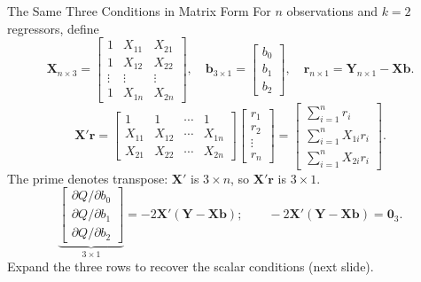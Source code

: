 \documentclass[notes,10pt, aspectratio=169]{beamer}
\begin{document}
\begin{frame}{The Same Three Conditions in Matrix Form}
\footnotesize
\setlength{\abovedisplayskip}{4pt}
\setlength{\belowdisplayskip}{4pt}
For $n$ observations and $k=2$ regressors, define
\[
\bm{X}_{n\times3}=\begin{bmatrix}1&X_{11}&X_{21}\\1&X_{12}&X_{22}\\\vdots&\vdots&\vdots\\1&X_{1n}&X_{2n}\end{bmatrix},
\quad \bm{b}_{3\times1}=\begin{bmatrix}b_0\\b_1\\b_2\end{bmatrix},
\quad \bm{r}_{n\times1}=\bm{Y}_{n\times1}-\bm{Xb}.
\]
\[
\bm{X}'\bm{r}
=\begin{bmatrix}1&1&\cdots&1\\X_{11}&X_{12}&\cdots&X_{1n}\\X_{21}&X_{22}&\cdots&X_{2n}\end{bmatrix}
\begin{bmatrix}r_1\\r_2\\\vdots\\r_n\end{bmatrix}
=\begin{bmatrix}\sum_{i=1}^{n}r_i\\\sum_{i=1}^{n}X_{1i}r_i\\\sum_{i=1}^{n}X_{2i}r_i\end{bmatrix}.
\]
The prime denotes transpose: $\bm{X}'$ is $3\times n$, so $\bm{X}'\bm{r}$ is $3\times1$.
\[
\underbrace{\begin{bmatrix}\partial Q/\partial b_0\\\partial Q/\partial b_1\\\partial Q/\partial b_2\end{bmatrix}}_{3\times1}
=-2\bm{X}'(\bm{Y}-\bm{Xb});\qquad
-2\bm{X}'(\bm{Y}-\bm{Xb})=\bm{0}_3.
\]
Expand the three rows to recover the scalar conditions (next slide).
\end{frame}
\end{document}

